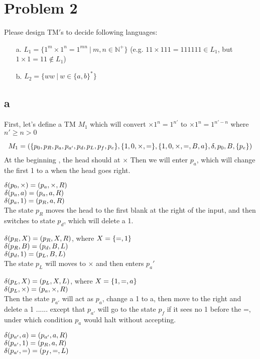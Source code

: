 \documentclass[a4paper,UTF8]{ctexart}
\theoremstyle{definition}
\begin{document}
\section*{Problem 2}
Please design TM$'$s to decide following languages:
\begin{enumerate}
  \item[a.] $L_1 = \{1^{m} \times 1^{n} = 1^{mn}\ |\ m, n \in \mathbb{N}^{+}\}$ (e.g. $11 \times 111 = 111111 \in L_1$, but $1 \times 1 = 11 \notin L_1$)
  \item[b.] $L_2 = \{ww\ |\ w \in \{a,b\}^{*}\}$
\end{enumerate}
\subsection*{a}
First, let's define a TM $M_1$ which will convert $\times 1^n=1^{n'}$
 to $\times 1^n=1^{n'-n}$
where $n' \geq n > 0 $

\[M_1 = (\{ p_0,p_R,p_a,p_{a'},p_d,p_L,p_f,p_e \},
\{ 1,0,\times,= \}
,\{ 1,0,\times,=,B,a \},\delta,p_0,B,\{ p_e \})  \]
At the beginning , the head should at $\times$
Then we will enter $p_a$, which will change the first 1 to a 
when the head goes right.

$\delta(p_0, \times)=(p_a,\times,R) $\\
$\delta(p_a,a)=(p_a,a,R)$\\
$\delta(p_a,1)=(p_R,a,R) $\\

The state $p_R$ moves the head to the first blank at the right of the input,
and then switches to state $p_d$, which will delete a 1.

$\delta(p_R,X)=(p_R,X,R) $, where $X = \{ =,1 \}$\\
$\delta(p_R,B)=(p_d,B,L) $\\
$\delta(p_d,1)=(p_L,B,L)$\\
The state $p_L$ will moves to $\times$ and then enters $p_a'$

$\delta(p_L,X)=(p_L,X,L)$, where $X=\{ 1,=,a \}$\\
$\delta(p_L,\times)=(p_a,\times,R)$\\ 

Then the state $p_{a'}$ will act as $p_a$, change a 1 to a, then 
move to the right and delete a 1 ...... except that $p_{a'}$
will go to the state $p_f$ if it sees no 1 before the =,
under which condition $p_a$ would halt without accepting. 

$\delta(p_{a'},a)=(p_{a'},a,R)$\\
$\delta(p_{a'},1)=(p_R,a,R) $\\
$\delta(p_{a'},=)=(p_f,=,L) $\\
\end{document}
